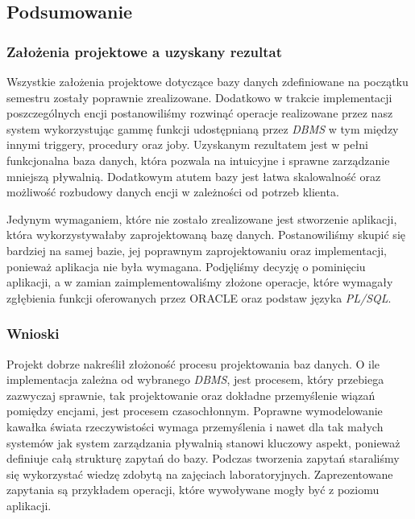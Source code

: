 \documentclass[a4paper]{article}
\begin{document}
\newpage

\subsection{Podsumowanie}

\subsubsection{Założenia projektowe a uzyskany rezultat}

Wszystkie założenia projektowe dotyczące bazy danych zdefiniowane na początku semestru zostały poprawnie zrealizowane. Dodatkowo w trakcie implementacji poszczególnych encji postanowiliśmy rozwinąć operacje realizowane przez nasz system wykorzystując gammę funkcji udostępnianą przez\textit{ DBMS} w tym między innymi triggery, procedury oraz joby. Uzyskanym rezultatem jest w pełni funkcjonalna baza danych, która pozwala na intuicyjne i sprawne zarządzanie mniejszą pływalnią. Dodatkowym atutem bazy jest łatwa skalowalność oraz możliwość rozbudowy danych encji w zależności od potrzeb klienta.

Jedynym wymaganiem, które nie zostało zrealizowane jest stworzenie aplikacji, która wykorzystywałaby zaprojektowaną bazę danych. Postanowiliśmy skupić się bardziej na samej bazie, jej poprawnym zaprojektowaniu oraz implementacji, ponieważ aplikacja nie była wymagana. Podjęliśmy decyzję o pominięciu aplikacji, a w zamian zaimplementowaliśmy złożone operacje, które wymagały zgłębienia funkcji oferowanych przez ORACLE oraz podstaw języka \textit{PL/SQL}.

\subsubsection{Wnioski}

Projekt dobrze nakreślił złożoność procesu projektowania baz danych. O ile implementacja zależna od wybranego \textit{DBMS}, jest procesem, który przebiega zazwyczaj sprawnie, tak projektowanie oraz dokładne przemyślenie wiązań pomiędzy encjami, jest procesem czasochłonnym. Poprawne wymodelowanie kawałka świata rzeczywistości wymaga przemyślenia i nawet dla tak małych systemów jak system zarządzania pływalnią stanowi kluczowy aspekt, ponieważ definiuje całą strukturę zapytań do bazy. Podczas tworzenia zapytań staraliśmy się wykorzystać wiedzę zdobytą na zajęciach laboratoryjnych. Zaprezentowane zapytania są przykładem operacji, które wywoływane mogły być z poziomu aplikacji.
\end{document}
